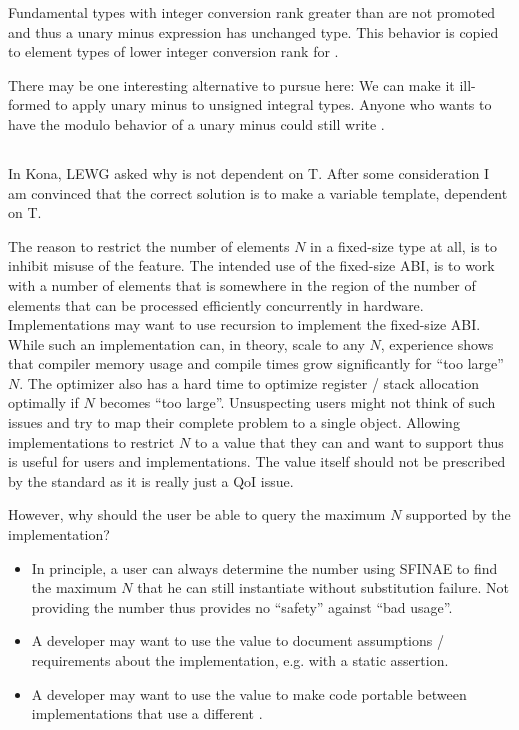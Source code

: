Fundamental types with integer conversion rank greater than \intt are not promoted and thus a unary minus expression has unchanged type.
This behavior is copied to element types of lower integer conversion rank for \simd.

There may be one interesting alternative to pursue here:
We can make it ill-formed to apply unary minus to unsigned integral types.
Anyone who wants to have the modulo behavior of a unary minus could still write .

\subsection{}\label{sec:maxfixedsize}
In Kona, LEWG asked why  is not dependent on \type T.
After some consideration I am convinced that the correct solution is to make  a variable template, dependent on \type T.

The reason to restrict the number of elements $N$ in a fixed-size \simd type at all, is to inhibit misuse of the feature.
The intended use of the fixed-size ABI, is to work with a number of elements that is somewhere in the region of the number of elements that can be processed efficiently concurrently in hardware.
Implementations may want to use recursion to implement the fixed-size ABI.
While such an implementation can, in theory, scale to any $N$, experience shows that compiler memory usage and compile times grow significantly for “too large” $N$.
The optimizer also has a hard time to optimize register / stack allocation optimally if $N$ becomes “too large”.
Unsuspecting users might not think of such issues and try to map their complete problem to a single \simd object.
Allowing implementations to restrict $N$ to a value that they can and want to support thus is useful for users and implementations.
The value itself should not be prescribed by the standard as it is really just a QoI issue.

However, why should the user be able to query the maximum $N$ supported by the implementation?
\begin{itemize}
  \item In principle, a user can always determine the number using SFINAE to find the maximum $N$ that he can still instantiate without substitution failure.
    Not providing the number thus provides no “safety” against “bad usage”.
  \item A developer may want to use the value to document assumptions / requirements about the implementation, e.g. with a static assertion.
  \item A developer may want to use the value to make code portable between implementations that use a different .
\end{itemize}

